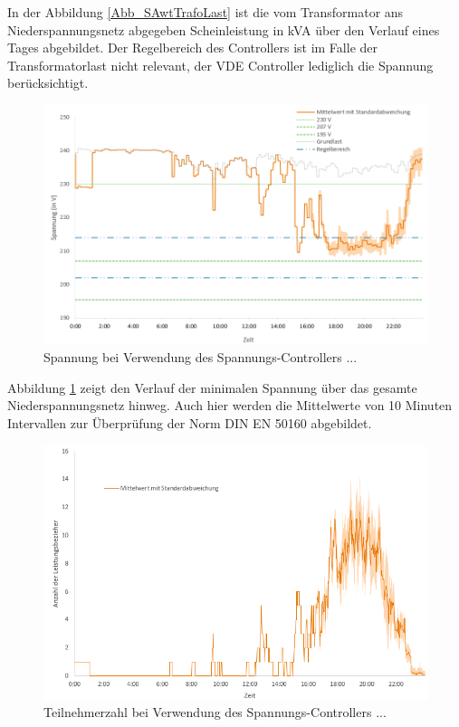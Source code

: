 In der Abbildung \ref{Abb_SAwtTrafoLast} ist die vom Transformator ans Niederspannungsnetz abgegeben Scheinleistung in kVA über den Verlauf eines Tages abgebildet. Der Regelbereich des Controllers ist im Falle der Transformatorlast nicht relevant, der VDE Controller lediglich die Spannung berücksichtigt.
\begin{figure}[htb]
\centering
	\includegraphics[scale=0.7]{img/SA_wt/Spannung_10m5.png}
	\caption{Spannung bei Verwendung des Spannungs-Controllers ...}
	\label{Abb_SAwtSpannung}
\end{figure}

Abbildung \ref{Abb_SAwtSpannung} zeigt den Verlauf der minimalen Spannung über das gesamte Niederspannungsnetz hinweg. Auch hier werden die Mittelwerte von 10 Minuten Intervallen zur Überprüfung der Norm DIN EN 50160 abgebildet.
\begin{figure}[htb]
\centering
	\includegraphics[scale=0.7]{img/SA_wT/Teilnehmer.png}
	\caption{Teilnehmerzahl bei Verwendung des Spannungs-Controllers ...}
	\label{Abb_SAwtTeilnehmer}
\end{figure}

